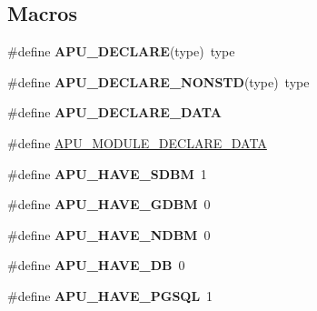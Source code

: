 \subsection*{Macros}
\begin{DoxyCompactItemize}
\item 
\hypertarget{group___a_p_r___util_ga408498ed57031391c19bf360cc61733a}{\#define {\bfseries A\-P\-U\-\_\-\-D\-E\-C\-L\-A\-R\-E}(type)~type}\label{group___a_p_r___util_ga408498ed57031391c19bf360cc61733a}

\item 
\hypertarget{group___a_p_r___util_ga03b160043a3b3a93e975085361683ff0}{\#define {\bfseries A\-P\-U\-\_\-\-D\-E\-C\-L\-A\-R\-E\-\_\-\-N\-O\-N\-S\-T\-D}(type)~type}\label{group___a_p_r___util_ga03b160043a3b3a93e975085361683ff0}

\item 
\hypertarget{group___a_p_r___util_ga7009cc3d445c4b2f93c80990230d7b3f}{\#define {\bfseries A\-P\-U\-\_\-\-D\-E\-C\-L\-A\-R\-E\-\_\-\-D\-A\-T\-A}}\label{group___a_p_r___util_ga7009cc3d445c4b2f93c80990230d7b3f}

\item 
\#define \hyperlink{group___a_p_r___util_ga9b0c0f8fe6546018d3a84a87fc3938f5}{A\-P\-U\-\_\-\-M\-O\-D\-U\-L\-E\-\_\-\-D\-E\-C\-L\-A\-R\-E\-\_\-\-D\-A\-T\-A}
\item 
\hypertarget{group___a_p_r___util_ga3a1ebf50d2a0bdb96f286004d29efbd3}{\#define {\bfseries A\-P\-U\-\_\-\-H\-A\-V\-E\-\_\-\-S\-D\-B\-M}~1}\label{group___a_p_r___util_ga3a1ebf50d2a0bdb96f286004d29efbd3}

\item 
\hypertarget{group___a_p_r___util_ga34ced7f6008f09de7f93d477b1c127a1}{\#define {\bfseries A\-P\-U\-\_\-\-H\-A\-V\-E\-\_\-\-G\-D\-B\-M}~0}\label{group___a_p_r___util_ga34ced7f6008f09de7f93d477b1c127a1}

\item 
\hypertarget{group___a_p_r___util_ga943eb69735e3e25b4eff0ab3a30c2aa7}{\#define {\bfseries A\-P\-U\-\_\-\-H\-A\-V\-E\-\_\-\-N\-D\-B\-M}~0}\label{group___a_p_r___util_ga943eb69735e3e25b4eff0ab3a30c2aa7}

\item 
\hypertarget{group___a_p_r___util_gabcb2f1d6b7ac86678bfaa36d78477b8c}{\#define {\bfseries A\-P\-U\-\_\-\-H\-A\-V\-E\-\_\-\-D\-B}~0}\label{group___a_p_r___util_gabcb2f1d6b7ac86678bfaa36d78477b8c}

\item 
\hypertarget{group___a_p_r___util_ga11a85b2049f152a2f5b4a89afa6051b7}{\#define {\bfseries A\-P\-U\-\_\-\-H\-A\-V\-E\-\_\-\-P\-G\-S\-Q\-L}~1}\label{group___a_p_r___util_ga11a85b2049f152a2f5b4a89afa6051b7}


\end{DoxyCompactItemize}
